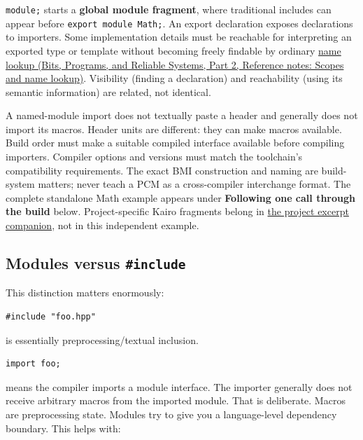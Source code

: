 \texttt{module;} starts a \textbf{global module fragment}, where traditional includes can appear before \texttt{export\ module\ Math;}. An export declaration exposes declarations to importers. Some implementation details must be reachable for interpreting an exported type or template without becoming freely findable by ordinary \href{../01-Bits-Programs-and-Reliable-Systems-P02/main.pdf\#nameddest=appendix-b12b31759da1}{name lookup (Bits, Programs, and Reliable Systems, Part 2, Reference notes: Scopes and name lookup)}. Visibility (finding a declaration) and reachability (using its semantic information) are related, not identical.

A named-module import does not textually paste a header and generally does not import its macros. Header units are different: they can make macros available. Build order must make a suitable compiled interface available before compiling importers. Compiler options and versions must match the toolchain's compatibility requirements. The exact BMI construction and naming are build-system matters; never teach a PCM as a cross-compiler interchange format. The complete standalone Math example appears under \textbf{Following one call through the build} below. Project-specific Kairo fragments belong in \hyperref[appendix-4e2236f53445-source-reported-c-project-excerpts]{the project excerpt companion}, not in this independent example.

\subsection{\texorpdfstring{Modules versus \texttt{\#include}}{Modules versus \#include}}\label{05-engine-i-ch002-modules-versus-include}

\hypertarget{05-engine-i-ch002-modules-versus-include}{}

This distinction matters enormously:

\begin{verbatim}
#include "foo.hpp"
\end{verbatim}

is essentially preprocessing/textual inclusion.

\begin{verbatim}
import foo;
\end{verbatim}

means the compiler imports a module interface. The importer generally does not receive arbitrary macros from the imported module. That is deliberate. Macros are preprocessing state. Modules try to give you a language-level dependency boundary. This helps with:

